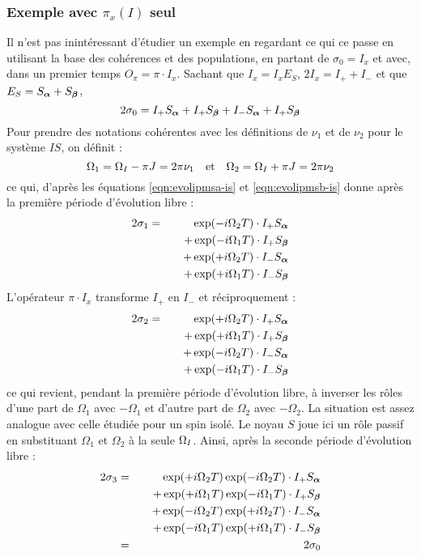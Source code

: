 \subsubsection{Exemple avec $\pi_x(I)$ seul}
Il n'est pas inintéressant d'étudier un exemple en regardant
ce qui ce passe en utilisant la base des cohérences et des populations,
en partant de $\sigma_0 = I_x$ et avec, dans un premier temps
$O_{\pi} = \pi \cdot I_x$.
Sachant que $I_x = I_xE_S$, $2I_x = I_+ + I_-$ et que $E_S = S_{\boldsymbol{\alpha}} + S_{\boldsymbol{\beta}}$,
\begin{equation}
2\sigma_0 = I_+S_{\boldsymbol{\alpha}} + I_+S_{\boldsymbol{\beta}} + I_-S_{\boldsymbol{\alpha}} + I_+S_{\boldsymbol{\beta}}
\end{equation}
Pour prendre des notations cohérentes avec les définitions de $\nu_1$ et de $\nu_2$
pour le système $IS$, on définit :
\begin{equation}
\Omega_1 = \Omega_I -\pi J = 2\pi\nu_1 \quad \mbox{et} \quad
\Omega_2 = \Omega_I +\pi J = 2\pi\nu_2
\end{equation}
ce qui, d'après les équations 
\ref{eqn:evolipmsa-is} et \ref{eqn:evolipmsb-is}
donne après la première période d'évolution libre :
\begin{eqnarray}
2\sigma_1 & = & \exp(-i\Omega_2 T) \cdot I_+S_{\boldsymbol{\alpha}} \nonumber\\
& & \quad + \exp(-i\Omega_1 T) \cdot I_+S_{\boldsymbol{\beta}} \nonumber\\
& & \quad + \exp(+i\Omega_2 T) \cdot I_-S_{\boldsymbol{\alpha}} \nonumber\\
& & \quad + \exp(+i\Omega_1 T) \cdot I_-S_{\boldsymbol{\beta}}
\end{eqnarray}
L'opérateur $\pi \cdot I_x$ transforme $I_+$ en $I_-$ et réciproquement :
\begin{eqnarray}
2\sigma_2 & = & \exp(+i\Omega_2 T) \cdot I_+S_{\boldsymbol{\alpha}} \nonumber\\
& & \quad + \exp(+i\Omega_1 T) \cdot I_+S_{\boldsymbol{\beta}} \nonumber\\
& & \quad + \exp(-i\Omega_2 T) \cdot I_-S_{\boldsymbol{\alpha}} \nonumber\\
& & \quad + \exp(-i\Omega_1 T) \cdot I_-S_{\boldsymbol{\beta}}
\end{eqnarray}
ce qui revient, pendant la première période d'évolution libre,
à inverser les rôles d'une part de $\Omega_1$ avec $-\Omega_1$
et d'autre part de $\Omega_2$ avec $-\Omega_2$.
La situation est assez analogue avec celle étudiée pour un spin isolé.
Le noyau $S$ joue ici un rôle passif en substituant $\Omega_1$ et $\Omega_2$ à 
la seule $\Omega_I$.
Ainsi, après la seconde période d'évolution libre :
\begin{eqnarray}
2\sigma_3 & = & \exp(+i\Omega_2 T)\exp(-i\Omega_2 T) \cdot I_+S_{\boldsymbol{\alpha}} \nonumber\\
& & \quad + \exp(+i\Omega_1 T)\exp(-i\Omega_1 T) \cdot I_+S_{\boldsymbol{\beta}} \nonumber\\
& & \quad + \exp(-i\Omega_2 T)\exp(+i\Omega_2 T) \cdot I_-S_{\boldsymbol{\alpha}} \nonumber\\
& & \quad + \exp(-i\Omega_1 T)\exp(+i\Omega_1 T) \cdot I_-S_{\boldsymbol{\beta}} \nonumber\\
& = & 2\sigma_0
\end{eqnarray}
